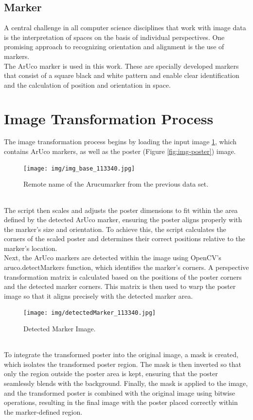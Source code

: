 \documentclass[a4paper,twocolumn]{article}
\begin{document}
\subsection{Marker}
A central challenge in all computer science disciplines that work with image data is the interpretation of spaces on the basis of individual perspectives. One promising approach to recognizing orientation and alignment is the use of markers.
\\
The ArUco marker is used in this work. These are specially developed markers that consist of a square black and white pattern and enable clear identification and the calculation of position and orientation in space. \cite{aruco1}

\section{Image Transformation Process}
The image transformation process begins by loading the input image \ref{fig:example-base}, which contains ArUco markers, as well as the poster (Figure \ref{fig:img-poster}) image. 
\begin{figure}[h!]
    \centering
    \texttt{[image: img/img\_base\_113340.jpg]} %
    \caption{Remote name of the Arucumarker from the previous data set.\cite{stefan-elser}}
    \label{fig:example-base}
\end{figure}
\\
The script then scales and adjusts the poster dimensions to fit within the area defined by the detected ArUco marker, ensuring the poster aligns properly with the marker's size and orientation. To achieve this, the script calculates the corners of the scaled poster and determines their correct positions relative to the marker's location. 
\\
Next, the ArUco markers are detected within the image using OpenCV's aruco.detectMarkers function, which identifies the marker's corners. A perspective transformation matrix is calculated based on the positions of the poster corners and the detected marker corners. This matrix is then used to warp the poster image so that it aligns precisely with the detected marker area.
\begin{figure}[h!]
    \centering
    \texttt{[image: img/detectedMarker\_113340.jpg]} %
    \caption{Detected Marker Image.\cite{stefan-elser}}
    \label{fig:detected-marker}
\end{figure}
\\
To integrate the transformed poster into the original image, a mask is created, which isolates the transformed poster region. 
The mask is then inverted so that only the region outside the poster area is kept, ensuring that the poster seamlessly blends with the background.
Finally, the mask is applied to the image, and the transformed poster is combined with the original image using bitwise operations, resulting in the final image with the poster placed correctly within the marker-defined region.
\end{document}
